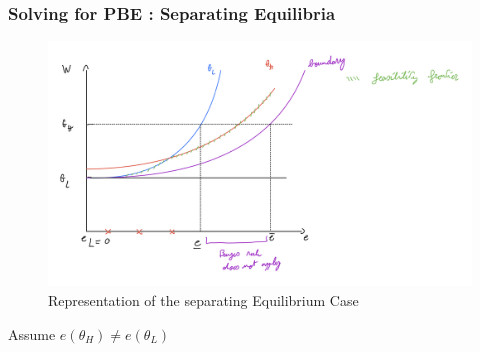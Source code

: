 \documentclass{article}
\begin{document}
\subsubsection{Solving for PBE :  Separating Equilibria}
\begin{figure}[H]
    \centering
\includegraphics[width=0.9\linewidth]{sep_equilibria.png}
    \caption{Representation of the separating Equilibrium Case}
    \label{fig:enter-label}
\end{figure}
Assume $e(\theta_H)\neq e(\theta_L)$
\end{document}
